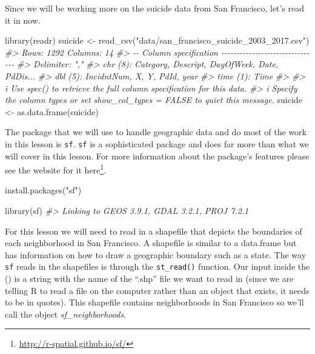 \documentclass[
]{krantz}
\makeatletter
\newenvironment{Shaded}{\begin{snugshade}}{\end{snugshade}}
\newcommand{\CommentTok}[1]{\textcolor[rgb]{0.37,0.37,0.37}{\textit{#1}}}
\newcommand{\FunctionTok}[1]{\textcolor[rgb]{0,0,0}{#1}}
\newcommand{\NormalTok}[1]{#1}
\newcommand{\OtherTok}[1]{\textcolor[rgb]{0.37,0.37,0.37}{#1}}
\newcommand{\StringTok}[1]{\textcolor[rgb]{0.5,0.5,0.5}{#1}}
\renewcommand{\href}[2]{#2\footnote{\url{#1}}}
\newenvironment{kframe}{%
\medskip{}
\setlength{\fboxsep}{.8em}
 \def\at@end@of@kframe{}%
 \ifinner\ifhmode%
  \def\at@end@of@kframe{\end{minipage}}%
  \begin{minipage}{\columnwidth}%
 \fi\fi%
 \def\FrameCommand##1{\hskip\@totalleftmargin \hskip-\fboxsep
 \colorbox{shadecolor}{##1}\hskip-\fboxsep
     \hskip-\linewidth \hskip-\@totalleftmargin \hskip\columnwidth}%
 \MakeFramed {\advance\hsize-\width
   \@totalleftmargin\z@ \linewidth\hsize
   \@setminipage}}%
 {\par\unskip\endMakeFramed%
 \at@end@of@kframe}
\renewenvironment{Shaded}{\begin{kframe}}{\end{kframe}}
\makeatother
\begin{document}
Since we will be working more on the suicide data from San Francisco, let's read it in now.

\begin{Shaded}
\begin{Highlighting}[]
\FunctionTok{library}\NormalTok{(readr)}
\NormalTok{suicide }\OtherTok{\textless{}{-}} \FunctionTok{read\_csv}\NormalTok{(}\StringTok{"data/san\_francisco\_suicide\_2003\_2017.csv"}\NormalTok{)}
\CommentTok{\#\textgreater{} Rows: 1292 Columns: 14}
\CommentTok{\#\textgreater{} {-}{-} Column specification {-}{-}{-}{-}{-}{-}{-}{-}{-}{-}{-}{-}{-}{-}{-}{-}{-}{-}{-}{-}{-}{-}{-}{-}{-}{-}{-}{-}{-}{-}{-}{-}}
\CommentTok{\#\textgreater{} Delimiter: ","}
\CommentTok{\#\textgreater{} chr  (8): Category, Descript, DayOfWeek, Date, PdDis...}
\CommentTok{\#\textgreater{} dbl  (5): IncidntNum, X, Y, PdId, year}
\CommentTok{\#\textgreater{} time (1): Time}
\CommentTok{\#\textgreater{} }
\CommentTok{\#\textgreater{} i Use \textasciigrave{}spec()\textasciigrave{} to retrieve the full column specification for this data.}
\CommentTok{\#\textgreater{} i Specify the column types or set \textasciigrave{}show\_col\_types = FALSE\textasciigrave{} to quiet this message.}
\NormalTok{suicide }\OtherTok{\textless{}{-}} \FunctionTok{as.data.frame}\NormalTok{(suicide)}
\end{Highlighting}
\end{Shaded}

The package that we will use to handle geographic data and do most of the work in this lesson is \texttt{sf}. \texttt{sf} is a sophisticated package and does far more than what we will cover in this lesson. For more information about the package's features please see the website for it \href{http://r-spatial.github.io/sf/}{here}.

\begin{Shaded}
\begin{Highlighting}[]
\FunctionTok{install.packages}\NormalTok{(}\StringTok{"sf"}\NormalTok{)}
\end{Highlighting}
\end{Shaded}

\begin{Shaded}
\begin{Highlighting}[]
\FunctionTok{library}\NormalTok{(sf)}
\CommentTok{\#\textgreater{} Linking to GEOS 3.9.1, GDAL 3.2.1, PROJ 7.2.1}
\end{Highlighting}
\end{Shaded}

For this lesson we will need to read in a shapefile that depicts the boundaries of each neighborhood in San Francisco. A shapefile is similar to a data.frame but has information on how to draw a geographic boundary such as a state. The way \texttt{sf} reads in the shapefiles is through the \texttt{st\_read()} function. Our input inside the () is a string with the name of the ``.shp'' file we want to read in (since we are telling R to read a file on the computer rather than an object that exists, it needs to be in quotes). This shapefile contains neighborhoods in San Francisco so we'll call the object \emph{sf\_neighborhoods}.
\end{document}
